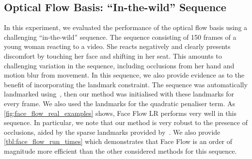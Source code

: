 \subsection{Optical Flow Basis: ``In-the-wild'' Sequence}\label{subsec:face_flow_experiments_real}
In this experiment, we evaluated the performance of the optical flow basis
using a challenging ``in-the-wild'' sequence.
The sequence consisting of 150 frames of a young woman reacting to a video.
She reacts negatively and clearly presents discomfort by touching her face and shifting
in her seat. This amounts to challenging variation in the sequence, including
occlusions from her hand and motion blur from movement. In this sequence,
we also provide evidence as to the benefit of incorporating the landmark constraint. The sequence was
automatically landmarked using~\cite{kazemi2014one}, then our method was initialised with
these landmarks for every frame. We also used the landmarks for the quadratic penaliser term.
As \cref{fig:face_flow_real_examples} shows, Face Flow LR performs very well in this sequence.
In particular, we note that our method is very robust to the presence of occlusions,
aided by the sparse landmarks provided by~\cite{kazemi2014one}.
We also provide \cref{tbl:face_flow_run_times}
which demonstrates that Face Flow is an order of magnitude more efficient than
the other considered methods for this sequence.
